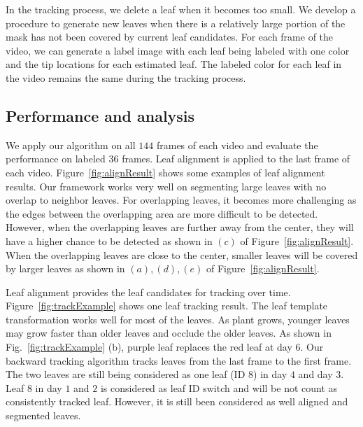 In the tracking process, we delete a leaf when it becomes too small.
We develop a procedure to generate new leaves when there is a relatively large portion of the mask has not been covered by current leaf candidates.
For each frame of the video, we can generate a label image with each leaf being labeled with one color and the tip locations for each estimated leaf.
The labeled color for each leaf in the video remains the same during the tracking process.



\subsection{Performance and analysis}
We apply our algorithm on all $144$ frames of each video and evaluate the performance on labeled $36$ frames.
Leaf alignment is applied to the last frame of each video.
Figure~\ref{fig:alignResult} shows some examples of leaf alignment results.
Our framework works very well on segmenting large leaves with no overlap to neighbor leaves.
For overlapping leaves, it becomes more challenging as the edges between the overlapping area are more difficult to be detected.
However, when the overlapping leaves are further away from the center, they will have a higher chance to be detected as shown in $(c)$ of Figure~\ref{fig:alignResult}.
When the overlapping leaves are close to the center, smaller leaves will be covered by larger leaves as shown in $(a), (d), (e)$ of Figure~\ref{fig:alignResult}.


Leaf alignment provides the leaf candidates for tracking over time.
Figure~\ref{fig:trackExample} shows one leaf tracking result. 
The leaf template transformation works well for most of the leaves.
As plant grows, younger leaves may grow faster than older leaves and occlude the older leaves.
As shown in Fig.~\ref{fig:trackExample} (b), purple leaf replaces the red leaf at day $6$.
Our backward tracking algorithm tracks leaves from the last frame to the first frame.
The two leaves are still being considered as one leaf (ID $8$) in day $4$ and day $3$. 
Leaf $8$ in day $1$ and $2$ is considered as leaf ID switch and will be not count as consistently tracked leaf. 
However, it is still been considered as well aligned and segmented leaves. 

